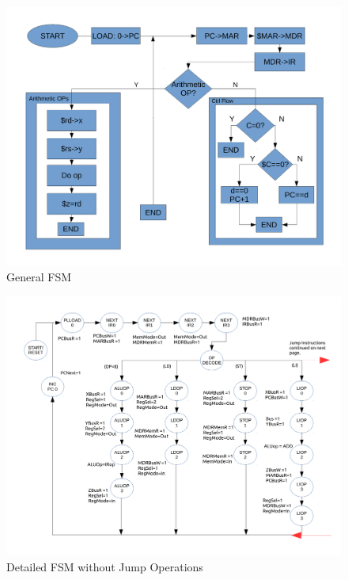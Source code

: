 \documentclass[conference]{IEEEtran}
\begin{document}
\clearpage

\begin{figure}[!t]
\centering
\includegraphics[width=\textwidth]{TopDownDesignDraftp2.pdf}
\caption{General FSM}
\label{fig_sim}
\end{figure}

\clearpage

\begin{figure}[!t]
\centering
\includegraphics[width=\textwidth]{ControlFSMp1.pdf}
\caption{Detailed FSM without Jump Operations}
\label{fig_sim}
\end{figure}


\clearpage
\end{document}
